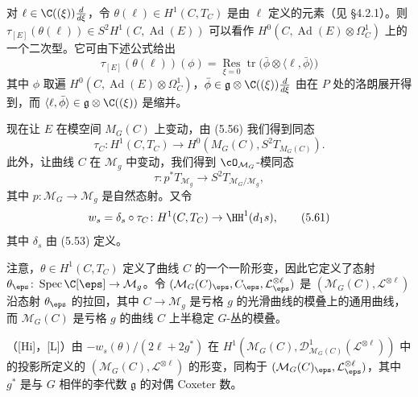 
对 $\ell\in\C((\xi))\frac{d}{d\xi}$，令 $\theta(\ell)\in H^1(C,T_C)$ 是由 $\ell$ 定义的元素（见 §4.2.1）。则 $\tau_{[E]}(\theta(\ell))\in S^2H^1(C,\operatorname{Ad}(E))$ 可以看作 $H^0(C,\operatorname{Ad}(E)\otimes\Omega^1_C)$ 上的一个二次型。它可由下述公式给出
\begin{equation}
 \tau_{[E]}(\theta(\ell))(\phi)=\operatorname*{Res}_{\xi=0}\operatorname{tr}\bigl(\bar\phi\otimes\langle\ell,\bar\phi\rangle\bigr) \tag{5.58}
\end{equation}
其中 $\phi$ 取遍 $H^0(C,\operatorname{Ad}(E)\otimes\Omega^1_C)$，$\bar\phi\in\mathfrak g\otimes\C((\xi))\frac{d}{d\xi}$ 由在 $P$ 处的洛朗展开得到，而 $\langle\ell,\bar\phi\rangle\in\mathfrak g\otimes\C((\xi))$ 是缩并。

现在让 $E$ 在模空间 $M_G(C)$ 上变动，由 (5.56) 我们得到同态
\begin{equation}
 \tau_C\colon H^1(C,T_C)\to H^0(M_G(C),S^2T_{M_G(C)}). \tag{5.59}
\end{equation}
此外，让曲线 $C$ 在 $\mathcal M_g$ 中变动，我们得到 $\cO_{\mathcal M_G}$-模同态
\begin{equation}
 \tau\colon p^*T_{\mathcal M_g}\to S^2T_{\mathcal M_G/\mathcal M_g}, \tag{5.60}
\end{equation}
其中 $p\colon\mathcal M_G\to\mathcal M_g$ 是自然态射。又令
\begin{equation}
 w_s=\delta_s\circ\tau_C\colon H^1(C,T_C)\to\HH^1(d_1s), \tag{5.61}
\end{equation}
其中 $\delta_s$ 由 (5.53) 定义。


注意，$\theta\in H^1(C,T_C)$ 定义了曲线 $C$ 的一个一阶形变，因此它定义了态射 $\theta_\eps\colon\operatorname{Spec}\C[\eps]\to\mathcal M_g$。令 $(\mathcal M_G(C)_\eps,C_\eps,\mathcal L^{\otimes\ell}_\eps)$ 是 $(\mathcal M_G(C),\mathcal L^{\otimes\ell})$ 沿态射 $\theta_\eps$ 的拉回，其中 $C\to\mathcal M_g$ 是亏格 $g$ 的光滑曲线的模叠上的通用曲线，而 $\mathcal M_G(C)$ 是亏格 $g$ 的曲线 $C$ 上半稳定 $G$-丛的模叠。

\begin{lemma}[5.30]（[Hi]，[L]）\quad 由 $-w_s(\theta)/(2\ell+2g^*)$ 在 $H^1(\mathcal M_G(C),\mathcal D_{\mathcal M_G(C)}^1(\mathcal L^{\otimes\ell}))$ 中的投影所定义的 $(\mathcal M_G(C),\mathcal L^{\otimes\ell})$ 的形变，同构于 $(\mathcal M_G(C)_\eps,\mathcal L^{\otimes\ell}_\eps)$，其中 $g^*$ 是与 $G$ 相伴的李代数 $\mathfrak g$ 的对偶 Coxeter 数。
\end{lemma}


